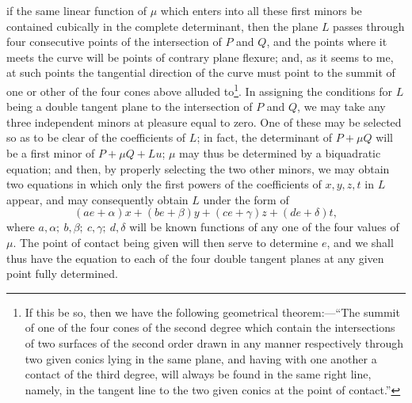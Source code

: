 \documentclass[11pt]{article}
\newcommand{\sourcepage}[1]{\marginpar{\scriptsize p.~#1}}
\begin{document}
\sourcepage{149}
if the same linear function of $\mu$ which enters into all these first minors be contained cubically in the complete determinant, then the plane $L$ passes through four consecutive points of the intersection of $P$ and $Q$, and the points where it meets the curve will be points of contrary plane flexure; and, as it seems to me, at such points the tangential direction of the curve must point to the summit of one or other of the four cones above alluded to\footnote{If this be so, then we have the following geometrical theorem:---``The summit of one of the four cones of the second degree which contain the intersections of two surfaces of the second order drawn in any manner respectively through two given conics lying in the same plane, and having with one another a contact of the third degree, will always be found in the same right line, namely, in the tangent line to the two given conics at the point of contact.''}. In assigning the conditions for $L$ being a double tangent plane to the intersection of $P$ and $Q$, we may take any three independent minors at pleasure equal to zero. One of these may be selected so as to be clear of the coefficients of $L$; in fact, the determinant of $P+\mu Q$ will be a first minor of $P+\mu Q+Lu$; $\mu$ may thus be determined by a biquadratic equation; and then, by properly selecting the two other minors, we may obtain two equations in which only the first powers of the coefficients of $x,y,z,t$ in $L$ appear, and may consequently obtain $L$ under the form of
\[
(ae+\alpha)x+(be+\beta)y+(ce+\gamma)z+(de+\delta)t,
\]
where $a,\alpha;\ b,\beta;\ c,\gamma;\ d,\delta$ will be known functions of any one of the four values of $\mu$. The point of contact being given will then serve to determine $e$, and we shall thus have the equation to each of the four double tangent planes at any given point fully determined.
\end{document}

